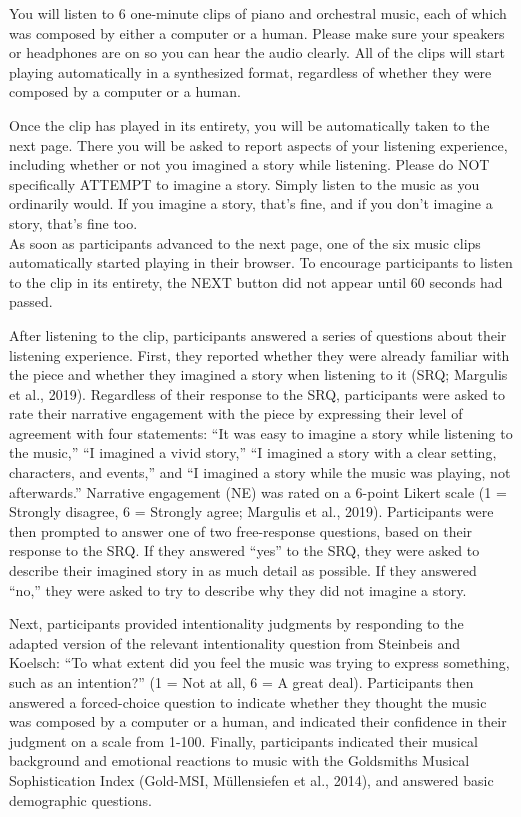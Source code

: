 \documentclass[12pt,twoside]{reedthesis}
\begin{document}
You will listen to 6 one-minute clips of piano and orchestral music, each of which was composed by either a computer or a human. Please make sure your speakers or headphones are on so you can hear the audio clearly. All of the clips will start playing automatically in a synthesized format, regardless of whether they were composed by a computer or a human.

Once the clip has played in its entirety, you will be automatically taken to the next page. There you will be asked to report aspects of your listening experience, including whether or not you imagined a story while listening. Please do NOT specifically ATTEMPT to imagine a story. Simply listen to the music as you ordinarily would. If you imagine a story, that’s fine, and if you don’t imagine a story, that’s fine too.
\\

As soon as participants advanced to the next page, one of the six music clips automatically started playing in their browser. To encourage participants to listen to the clip in its entirety, the NEXT button did not appear until 60 seconds had passed. 

After listening to the clip, participants answered a series of questions about their listening experience. First, they reported whether they were already familiar with the piece and whether they imagined a story when listening to it (SRQ; Margulis et al., 2019). Regardless of their response to the SRQ, participants were asked to rate their narrative engagement with the piece by expressing their level of agreement with four statements: “It was easy to imagine a story while listening to the music,” “I imagined a vivid story,” “I imagined a story with a clear setting, characters, and events,” and “I imagined a story while the music was playing, not afterwards.” Narrative engagement (NE) was rated on a 6-point Likert scale (1 = Strongly disagree, 6 = Strongly agree; Margulis et al., 2019). Participants were then prompted to answer one of two free-response questions, based on their response to the SRQ. If they answered “yes” to the SRQ, they were asked to describe their imagined story in as much detail as possible. If they answered “no,” they were asked to try to describe why they did not imagine a story. 

Next, participants provided intentionality judgments by responding to the adapted version of the relevant intentionality question from Steinbeis and Koelsch: “To what extent did you feel the music was trying to express something, such as an intention?” (1 = Not at all, 6 = A great deal). Participants then answered a forced-choice question to indicate whether they thought the music was composed by a computer or a human, and indicated their confidence in their judgment on a scale from 1-100. Finally, participants indicated their musical background and emotional reactions to music with the Goldsmiths Musical Sophistication Index (Gold-MSI, Müllensiefen et al., 2014), and answered basic demographic questions.
\end{document}
